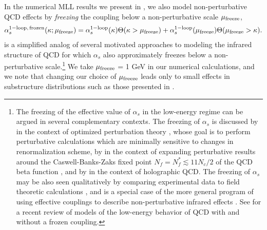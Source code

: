 \documentclass[letterpaper,11pt]{article}
\begin{document}
In the numerical MLL results we present in , we also model non-perturbative QCD effects by \textit{freezing} the coupling below a non-perturbative scale \(\mu_{\rm freeze}\),
\begin{align}
    \alpha^{\rm 1-loop,\,frozen}_s(\kappa; \mu_{\rm freeze})
    =
    \alpha^{\rm 1-loop}_s(\kappa)
    \Theta(\kappa > \mu_{\rm freeze})
    +
    \alpha^{\rm 1-loop}_s(\mu_{\rm freeze})
    \Theta(\mu_{\rm freeze} > \kappa)
    .
    \label{eqn:frozencoupling}
\end{align}
%
 is a simplified analog of several motivated approaches to modeling the infrared structure of QCD for which \(\alpha_s\) also approximately freezes below a non-perturbative scale.\footnote{The freezing of the effective value of \(\alpha_s\) in the low-energy regime can be argued in several complementary contexts.
%
The freezing of \(\alpha_s\) is discussed by  in the context of optimized perturbation theory \cite{Stevenson:1981vj}, whose goal is to perform perturbative calculations which are minimally sensitive to changes in renormalization scheme, by  in the context of expanding perturbative results around the Caswell-Banks-Zaks fixed point \(N_f = N_f^* \lesssim 11 N_c / 2\) of the QCD beta function \cite{Caswell:1974gg,Banks:1981nn}, and by  in the context of holographic QCD.
%
The freezing of \(\alpha_s\) may be also seen qualitatively by comparing experimental data to field theoretic calculations \cite{Deur:2008rf,Deur:2009tj,Binosi:2016nme}, and is a special case of the more general program of using effective couplings to describe non-perturbative infrared effects \cite{Dokshitzer:1995qm,Dokshitzer:1995zt,Dokshitzer:1997ew,Dokshitzer:1997iz,Korchemsky:1999kt}.
%
See  for a recent review of models of the low-energy behavior of QCD with and without a frozen coupling.
}
%
We take \(\mu_{\rm freeze}\) = 1 GeV in our numerical calculations, and we note that changing our choice of \(\mu_{\rm freeze}\) leads only to small effects in substructure distributions such as those presented in .
%
%
%
\end{document}
